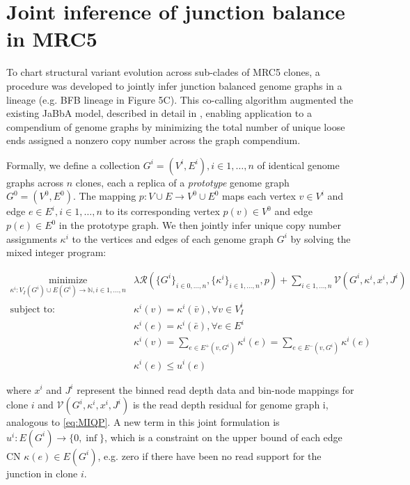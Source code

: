 \documentclass[phd,tocprelim]{cornell}
\begin{document}
\section{Joint inference of junction balance in MRC5} \label{sec:joint_jabba_mrc5}
To chart structural variant evolution across sub-clades of MRC5 clones, a procedure was developed to jointly infer junction balanced genome graphs in a lineage (e.g. BFB lineage in Figure 5C). This co-calling algorithm augmented the existing JaBbA model, described in detail in \cite{Hadi2020-um}, enabling application to a compendium of genome graphs by minimizing the total number of unique loose ends assigned a nonzero copy number across the graph compendium.  

Formally, we define a collection ${G^i = (V^i, E^i)}, i \in 1,\dots,n$ of identical genome graphs across $n$ clones, each a replica of a \textit{prototype} genome graph $G^0 = (V^0, E^0)$. The mapping $p:V \cup E \rightarrow V^0 \cup E^0$ maps each vertex $v \in V^i$ and edge $e \in E^i,i \in 1,\dots,n$ to its corresponding vertex $p(v)\in V^0$ and edge $p(e) \in E^0$ in the prototype graph. We then jointly infer unique copy number assignments $\kappa^i$ to the vertices and edges of each genome graph $G^i$ by solving the mixed integer program:

\begin{equation} \label{eq:multi_sample_jabba}
    \begin{aligned}
        \underset{\kappa^i:V_I(G^i) \cup E(G^i) \rightarrow \mathbb{N}, i \in 1,\dots,n}{\text{minimize}} &
        \lambda \mathcal{R}(\{G^i\}_{i \in 0, \dots, n}, \{\kappa^i\}_{i \in 1, \dots, n}, p) + \sum_{i \in 1,\dots,n}\mathcal{V}(G^i, \kappa^i, x^i, J^i) \\
        \text{subject to: } & \kappa^i(v) = \kappa^i(\bar{v}), \forall{v \in V_I^i} \\
        & \kappa^i(e) = \kappa^i(\bar{e}), \forall{e \in E^i} \\
        & \kappa^i(v) = \sum_{e \in E^+(v,G^i)}\kappa^i(e) = \sum_{e \in E^-(v, G^i)}\kappa^i(e) \\
        & \kappa^i(e) \le u^i(e)
    \end{aligned}
\end{equation}

where $x^i$ and $J^i$ represent the binned read depth data and bin-node mappings for clone $i$ and  $\mathcal{V}(G^i,κ^i,x^i,J^i)$ is the read depth residual for genome graph i, analogous to \ref{eq:MIQP}.  A new term in this joint formulation is $u^i:E(G^i) \rightarrow \{0,\inf\}$, which is a constraint on the upper bound of each edge CN $\kappa(e) \in E(G^i)$, e.g. zero if there have been no read support for the junction in clone $i$. 
\end{document}
